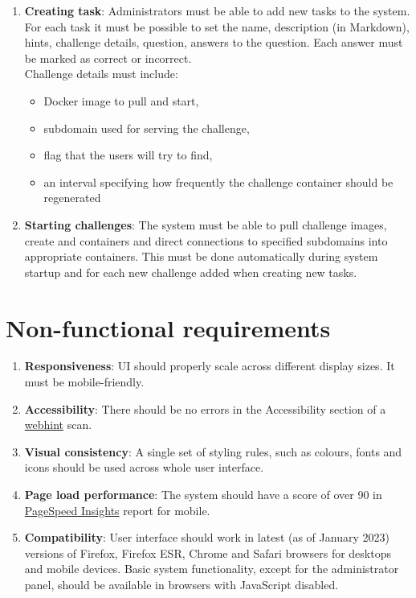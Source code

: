 \begin{enumerate}
	\item \textbf{Creating task}: Administrators must be able to add new tasks to the system. For each task it must be possible to set the name, description (in Markdown), hints, challenge details, question, answers to the question. Each answer must be marked as correct or incorrect.\\
	Challenge details must include:
	\begin{itemize}
		\item Docker image to pull and start,
		\item subdomain used for serving the challenge,
		\item flag that the users will try to find,
		\item an interval specifying how frequently the challenge container should be regenerated
	\end{itemize}

	\item \textbf{Starting challenges}: The system must be able to pull challenge images, create and containers and direct connections to specified subdomains into appropriate containers. This must be done automatically during system startup and for each new challenge added when creating new tasks.
\end{enumerate}

\section{Non-functional requirements}

\begin{enumerate}
	\item \textbf{Responsiveness}: UI should properly scale across different display sizes. It must be mobile-friendly.

	\item \textbf{Accessibility}: There should be no errors in the Accessibility section of a \href{https://webhint.io/}{webhint} scan.

	\item \textbf{Visual consistency}: A single set of styling rules, such as colours, fonts and icons should be used across whole user interface.

	\item \textbf{Page load performance}: The system should have a score of over 90 in \href{https://pagespeed.web.dev}{PageSpeed Insights} report for mobile.

	\item \textbf{Compatibility}: User interface should work in latest (as of January 2023) versions of Firefox, Firefox ESR, Chrome and Safari browsers for desktops and mobile devices. Basic system functionality, except for the administrator panel, should be available in browsers with JavaScript disabled.
\end{enumerate}

